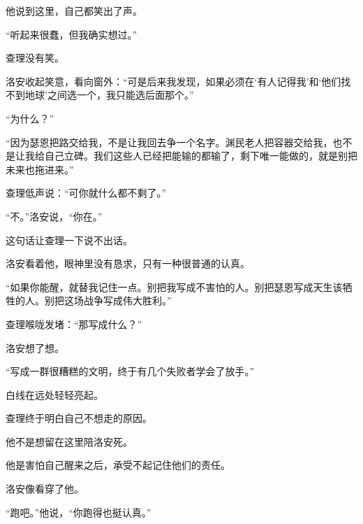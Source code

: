 他说到这里，自己都笑出了声。

“听起来很蠢，但我确实想过。”

查理没有笑。

洛安收起笑意，看向窗外：“可是后来我发现，如果必须在‘有人记得我’和‘他们找不到地球’之间选一个，我只能选后面那个。”

“为什么？”

“因为瑟恩把路交给我，不是让我回去争一个名字。渊民老人把容器交给我，也不是让我给自己立碑。我们这些人已经把能输的都输了，剩下唯一能做的，就是别把未来也拖进来。”

查理低声说：“可你就什么都不剩了。”

“不。”洛安说，“你在。”

这句话让查理一下说不出话。

洛安看着他，眼神里没有恳求，只有一种很普通的认真。

“如果你能醒，就替我记住一点。别把我写成不害怕的人。别把瑟恩写成天生该牺牲的人。别把这场战争写成伟大胜利。”

查理喉咙发堵：“那写成什么？”

洛安想了想。

“写成一群很糟糕的文明，终于有几个失败者学会了放手。”

白线在远处轻轻亮起。

查理终于明白自己不想走的原因。

他不是想留在这里陪洛安死。

他是害怕自己醒来之后，承受不起记住他们的责任。

洛安像看穿了他。

“跑吧。”他说，“你跑得也挺认真。”
